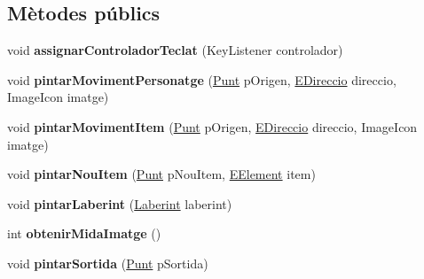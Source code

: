 \subsection*{Mètodes públics}
\begin{DoxyCompactItemize}
\item 
\hypertarget{interfaceinterficie_1_1_i_pintador_laberint_acdd1fc6177c514b992f416ef2aa61ec2}{void {\bfseries assignar\+Controlador\+Teclat} (Key\+Listener controlador)}\label{interfaceinterficie_1_1_i_pintador_laberint_acdd1fc6177c514b992f416ef2aa61ec2}

\item 
\hypertarget{interfaceinterficie_1_1_i_pintador_laberint_aafb217de7602afc7e2534b21d9edf3fc}{void {\bfseries pintar\+Moviment\+Personatge} (\hyperlink{classlogica_1_1_punt}{Punt} p\+Origen, \hyperlink{enumlogica_1_1enumeracions_1_1_e_direccio}{E\+Direccio} direccio, Image\+Icon imatge)}\label{interfaceinterficie_1_1_i_pintador_laberint_aafb217de7602afc7e2534b21d9edf3fc}

\item 
\hypertarget{interfaceinterficie_1_1_i_pintador_laberint_ac94f8e147f795a3b75f911b36e3f4cfe}{void {\bfseries pintar\+Moviment\+Item} (\hyperlink{classlogica_1_1_punt}{Punt} p\+Origen, \hyperlink{enumlogica_1_1enumeracions_1_1_e_direccio}{E\+Direccio} direccio, Image\+Icon imatge)}\label{interfaceinterficie_1_1_i_pintador_laberint_ac94f8e147f795a3b75f911b36e3f4cfe}

\item 
\hypertarget{interfaceinterficie_1_1_i_pintador_laberint_af2f3db2e7020f3e39364deddb9c9b8a2}{void {\bfseries pintar\+Nou\+Item} (\hyperlink{classlogica_1_1_punt}{Punt} p\+Nou\+Item, \hyperlink{enumlogica_1_1enumeracions_1_1_e_element}{E\+Element} item)}\label{interfaceinterficie_1_1_i_pintador_laberint_af2f3db2e7020f3e39364deddb9c9b8a2}

\item 
\hypertarget{interfaceinterficie_1_1_i_pintador_laberint_ad2d79f039cd3d67af2ad0d2e12f99e99}{void {\bfseries pintar\+Laberint} (\hyperlink{classlogica_1_1laberints_1_1_laberint}{Laberint} laberint)}\label{interfaceinterficie_1_1_i_pintador_laberint_ad2d79f039cd3d67af2ad0d2e12f99e99}

\item 
\hypertarget{interfaceinterficie_1_1_i_pintador_laberint_a092b5366087d486f0568ad51dc8ba772}{int {\bfseries obtenir\+Mida\+Imatge} ()}\label{interfaceinterficie_1_1_i_pintador_laberint_a092b5366087d486f0568ad51dc8ba772}

\item 
\hypertarget{interfaceinterficie_1_1_i_pintador_laberint_ae8e250a2c2a2f745e6700bf65be9fe9a}{void {\bfseries pintar\+Sortida} (\hyperlink{classlogica_1_1_punt}{Punt} p\+Sortida)}\label{interfaceinterficie_1_1_i_pintador_laberint_ae8e250a2c2a2f745e6700bf65be9fe9a}

\end{DoxyCompactItemize}


